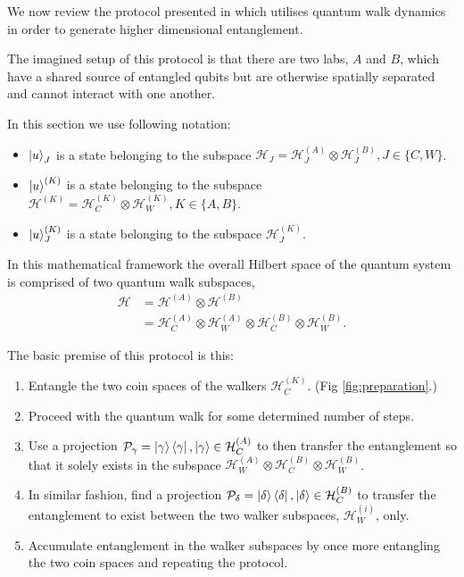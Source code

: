 We now review the protocol presented in \cite{giordani2020} which utilises quantum walk dynamics in order to generate higher dimensional entanglement.

The imagined setup of this protocol is that there are two labs, $A$ and $B$, which have a shared source of entangled qubits but are otherwise spatially separated and cannot interact with one another.

In this section we use following notation:
\begin{itemize}
    \item $\ket{u}_J$ is a state belonging to the subspace $\mathcal{H}_J = \mathcal{H}^{(A)}_J \otimes \mathcal{H}^{(B)}_J, J\in\{C,W\}$.
    \item $\ket{u}^{(K)}$ is a state belonging to the subspace $\mathcal{H}^{(K)} = \mathcal{H}^{(K)}_C \otimes \mathcal{H}^{(K)}_W, K\in\{A,B\}$.
    \item  $\ket{u}^{(K)}_J$ is a state belonging to the subspace $\mathcal{H}^{(K)}_J$.
\end{itemize}

In this mathematical framework the overall Hilbert space of the quantum system is comprised of two quantum walk subspaces,
\begin{align}
    \mathcal{H} &= \mathcal{H}^{(A)} \otimes \mathcal{H}^{(B)}\\
                &= \mathcal{H}^{(A)}_C \otimes \mathcal{H}^{(A)}_W \otimes \mathcal{H}^{(B)}_C \otimes \mathcal{H}^{(B)}_W.
\end{align}

The basic premise of this protocol is this:
\begin{enumerate}
    \item Entangle the two coin spaces of the walkers $\mathcal{H}^{(K)}_C$. (Fig \ref{fig:preparation}.)
    \item Proceed with the quantum walk for some determined number of steps.
    \item Use a projection $\mathcal{P}_\gamma = \ket{\gamma}\bra{\gamma}, \ket{\gamma}\in\mathcal{H}^{(A)}_C$ to then transfer the entanglement so that it solely exists in the subspace $\mathcal{H}^{(A)}_W \otimes \mathcal{H}^{(B)}_C \otimes \mathcal{H}^{(B)}_W$.
    \item In similar fashion, find a projection $\mathcal{P}_\delta = \ket{\delta}\bra{\delta}, \ket{\delta}\in\mathcal{H}^{(B)}_C$ to transfer the entanglement to exist between the two walker subspaces, $\mathcal{H}^{(i)}_W$, only.
    \item Accumulate entanglement in the walker subspaces by once more entangling the two coin spaces and repeating the protocol.
\end{enumerate}

